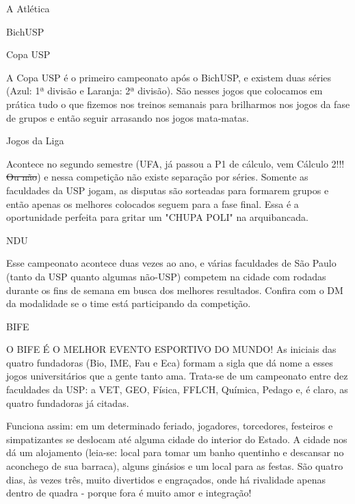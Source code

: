 \begin{secao}{A Atlética}
\begin{subsecao}{BichUSP}
\end{subsecao}
\begin{subsecao}{Copa USP}

A Copa USP é o primeiro campeonato após o BichUSP, e existem duas séries (Azul:
1ª divisão e Laranja: 2ª divisão). São nesses jogos que colocamos em prática
tudo o que fizemos nos treinos semanais para brilharmos nos jogos da fase de
grupos e então seguir arrasando nos jogos mata-matas.

\end{subsecao}
\begin{subsecao}{Jogos da Liga}

Acontece no segundo semestre (UFA, já passou a P1 de cálculo, vem Cálculo 2!!!
\sout{Ou não}) e nessa competição não existe separação por séries. Somente as
faculdades da USP jogam, as disputas são sorteadas para formarem grupos e
então apenas os melhores colocados seguem para a fase final. Essa é a
oportunidade perfeita para gritar um "CHUPA POLI" na arquibancada.

\end{subsecao}
\begin{subsecao}{NDU}

Esse campeonato acontece duas vezes ao ano, e várias faculdades de São Paulo
(tanto da USP quanto algumas não-USP) competem na cidade com rodadas durante
os fins de semana em busca dos melhores
resultados. Confira com o DM da modalidade se o time está participando da
competição.

\end{subsecao}
\begin{subsecao}{BIFE}

O BIFE É O MELHOR EVENTO ESPORTIVO DO MUNDO! As iniciais das quatro fundadoras
(Bio, IME, Fau e Eca) formam a sigla que dá nome a esses jogos universitários
que a gente tanto ama. Trata-se de um campeonato entre dez faculdades da USP:
a VET, GEO, Física, FFLCH, Química, Pedago e, é claro, as quatro fundadoras já citadas.

Funciona assim: em um determinado feriado, jogadores, torcedores, festeiros e
simpatizantes se deslocam até alguma cidade do interior do Estado. A cidade nos
dá um alojamento (leia-se: local para tomar um banho quentinho e descansar no
aconchego de sua barraca), alguns ginásios e um local para as festas. São
quatro dias, às vezes três, muito divertidos e engraçados, onde há rivalidade apenas dentro de
quadra - porque fora é muito amor e integração!


\end{subsecao}
\end{secao}
